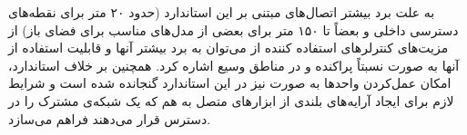 به علت برد بیشتر اتصال‌های مبتنی بر این استاندارد (حدود ۲۰ متر برای نقطه‌های دسترسی داخلی و بعضاً تا ۱۵۰ متر برای بعضی از مدل‌های مناسب برای فضای باز) از مزیت‌های کنترلرهای استفاده کننده از  می‌توان به برد بیشتر آنها و قابلیت استفاده از آنها به صورت نسبتاً پراکنده و در مناطق وسیع اشاره کرد. همچنین بر خلاف استاندارد، امکان عمل‌کردن واحدها به صورت  نیز در این استاندارد گنجانده شده است و شرایط لازم برای ایجاد آرایه‌های بلندی از ابزارهای متصل به هم که یک شبکه‌ی مشترک را در دسترس قرار می‌دهند فراهم می‌سازد.

